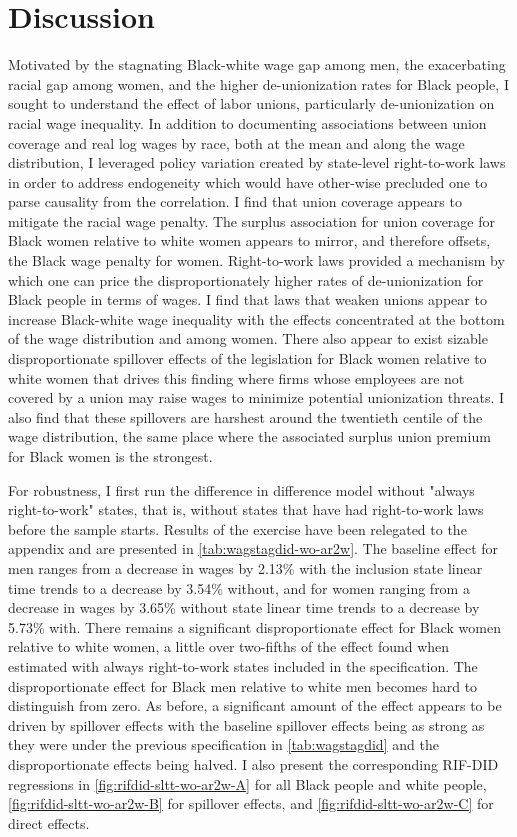 \documentclass[11pt]{article}
\begin{document}
\section{Discussion}\label{sec:disc}
Motivated by the stagnating Black-white wage gap among men, the exacerbating racial gap among women, and the higher de-unionization rates for Black people, I sought to understand the effect of labor unions, particularly de-unionization on racial wage inequality. In addition to documenting associations between union coverage and real log wages by race, both at the mean and along the wage distribution, I leveraged policy variation created by state-level right-to-work laws in order to address endogeneity which would have other-wise precluded one to parse causality from the correlation. I find that union coverage appears to mitigate the racial wage penalty. The surplus association for union coverage for Black women relative to white women appears to mirror, and therefore offsets, the Black wage penalty for women. Right-to-work laws provided a mechanism by which one can price the disproportionately higher rates of de-unionization for Black people in terms of wages. I find that laws that weaken unions appear to increase Black-white wage inequality with the effects concentrated at the bottom of the wage distribution and among women. There also appear to exist sizable disproportionate spillover effects of the legislation for Black women relative to white women that drives this finding where firms whose employees are not covered by a union may raise wages to minimize potential unionization threats. I also find that these spillovers are harshest around the twentieth centile of the wage distribution, the same place where the associated surplus union premium for Black women is the strongest.

For robustness, I first run the difference in difference model without "always right-to-work" states, that is, without states that have had right-to-work laws before the sample starts. Results of the exercise have been relegated to the appendix and are presented in \autoref{tab:wagstagdid-wo-ar2w}. The baseline effect for men ranges from a decrease in wages by 2.13\% with the inclusion state linear time trends to a decrease by 3.54\% without, and for women ranging from a decrease in wages by 3.65\% without state linear time trends to a decrease by 5.73\% with. There remains a significant disproportionate effect for Black women relative to white women, a little over two-fifths of the effect found when estimated with always right-to-work states included in the specification. The disproportionate effect for Black men relative to white men becomes hard to distinguish from zero. As before, a significant amount of the effect appears to be driven by spillover effects with the baseline spillover effects being as strong as they were under the previous specification in \autoref{tab:wagstagdid} and the disproportionate effects being halved. I also present the corresponding RIF-DID regressions in \autoref{fig:rifdid-sltt-wo-ar2w-A} for all Black people and white people, \autoref{fig:rifdid-sltt-wo-ar2w-B} for spillover effects, and \autoref{fig:rifdid-sltt-wo-ar2w-C} for direct effects.
\end{document}
